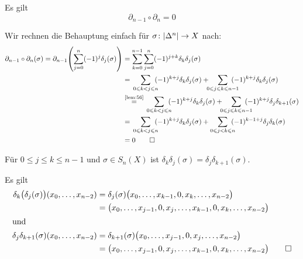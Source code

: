 \begin{proposition}[{name=[{Für die Randabbildungen gilt $\partial_{n-1} \circ \partial_n = 0$}]},label=prop:55]
	Es gilt
	\[
		\partial_{n-1} \circ \partial_n = 0
	\]
\end{proposition}
\begin{beweis}
	Wir rechnen die Behauptung einfach für $\sigma \colon \abs*{\Delta^n}\to X$ nach:
	\begin{align*}
		\partial_{n-1} \circ \partial_n(\sigma) = \partial_{n-1} \enbrace*{\sum_{j=0}^{n} (-1)^j \delta_j(\sigma)} &= 
		\sum_{k=0}^{n-1} \sum_{j=0}^{n} (-1)^{j+k} \delta_k \delta_j(\sigma)   \\
		&= \,\sum_{0 \le k < j \le n} \!\!\! (-1)^{k+j} \delta_k \delta_j(\sigma) +\!\!\!\smashoperator[r]{\sum_{0 \le j \le k \le n-1}} \enspace(-1)^{k+j} \delta_k\delta_j(\sigma) \\
		&\StackText{\ref{lem:56}}{=} \, \sum_{0 \le k < j \le n} \!\!\!(-1)^{k+j} \delta_k \delta_j(\sigma) + \!\!\!\smashoperator[r]{\sum_{0 \le j \le k \le n-1}} \enspace(-1)^{k+j} \delta_j \delta_{k+1}(\sigma) \\
		&= \,\sum_{0 \le k < j \le n} \!\!\! (-1)^{k+j} \delta_k \delta_j(\sigma) + \smashoperator[r]{\sum_{0 \le j < k \le n}} \enspace(-1)^{k-1+j} \delta_j \delta_k(\sigma) \\
		&= 0 \qedhere
	\end{align*}
\end{beweis}

\begin{lemma}[{name=[Hilfslemma für Proposition \ref{prop:55}]},label=lem:56]
	Für $0 \le j \le k \le n-1$ und $\sigma \in S_n(X)$ ist $\delta_k \delta_j(\sigma) = \delta_j \delta_{k+1}(\sigma)$.
\end{lemma}
\begin{beweis}
	Es gilt
	\begin{align*}
		\delta_k \enbrace[\big]{\delta_j(\sigma)} \enbrace*{x_0, \ldots , x_{n-2}} &= \delta_j(\sigma) \enbrace[\big]{x_0, \ldots , x_{k-1}, 0, x_k , \ldots ,x_{n-2}}  \\
		&= \enbrace[\big]{x_0, \ldots , x_{j-1},0,x_j, \ldots , x_{k-1},0,x_k, \ldots, x_{n-2}}  \\
		\intertext{und}
		\delta_j \delta_{k+1}(\sigma) \enbrace*{x_0, \ldots , x_{n-2}} &= \delta_{k+1}(\sigma) \enbrace[\big]{x_0, \ldots , x_{j-1},0,x_j,\ldots , x_{n-2}} \\
		&= \enbrace[\big]{x_0, \ldots , x_{j-1},0,x_j, \ldots , x_{k-1},0, x_k, \ldots , x_{n-2}} \qedhere
	\end{align*}
\end{beweis}

